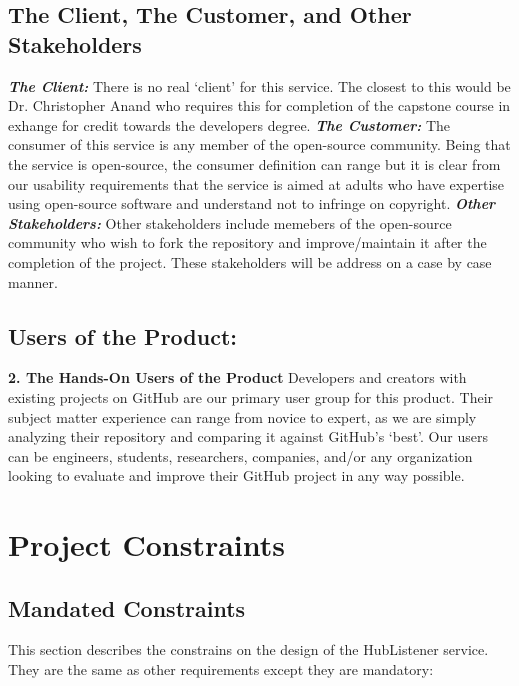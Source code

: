 \documentclass{article}
\begin{document}
\subsection{The Client, The Customer, and Other Stakeholders}
\textbf{\textit{The Client:}}
There is no real `client' for this service. The closest to this would be Dr. Christopher Anand who requires this for completion of the capstone course in exhange for credit towards the developers degree.  \newline
\textbf{\textit{The Customer:}}
The consumer of this service is any member of the open-source community. Being that the service is open-source, the consumer definition can range but it is clear from our usability requirements that the service is aimed at adults who have expertise using open-source software and understand not to infringe on copyright. \newline
\textbf{\textit{Other Stakeholders:}}
Other stakeholders include memebers of the open-source community who wish to fork the repository and improve/maintain it after the completion of the project. These stakeholders will be address on a case by case manner. \newline

\subsection{Users of the Product:}
\textbf{2. The Hands-On Users of the Product}
Developers and creators with existing projects on GitHub are our primary user group for this product. Their subject matter experience can range from novice to expert, as we are simply analyzing their repository and comparing it against GitHub’s ‘best’. Our users can be engineers, students, researchers, companies, and/or any organization looking to evaluate and improve their GitHub project in any way possible. 
\newpage


\section{Project Constraints}
\subsection{Mandated Constraints}

This section describes the constrains on the design of the HubListener service. They are the same as other requirements except they are mandatory:\newline
\newline
\end{document}
